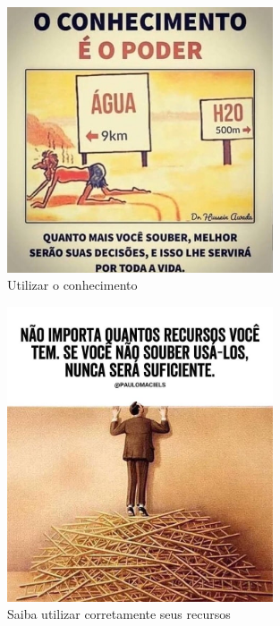 \begin{figure}
    \centering
	\includegraphics[width=0.7\textwidth]{erros/conhecimento_h2o.jpg}
    \caption{Utilizar o conhecimento}
    \label{fig:conhecimento_h2o}
\end{figure}

\begin{figure}
    \centering
	\includegraphics[width=0.7\textwidth]{erros/uso_de_recursos_escada_1.jpg}
    \caption{Saiba utilizar corretamente seus recursos}
    \label{fig:uso_recursos_escada_1}
\end{figure}

